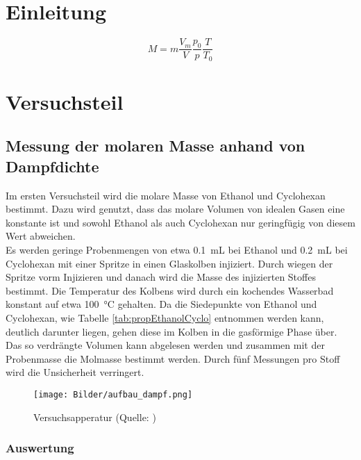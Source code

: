 \section{Einleitung}

\begin{equation}
	M = m \frac{V_m}{V}\frac{p_0}{p}\frac{T}{T_0} \label{eq:dampfMolMasse}
\end{equation}

\section{Versuchsteil}
\subsection{Messung der molaren Masse anhand von Dampfdichte}
Im ersten Versuchsteil wird die molare Masse von Ethanol und Cyclohexan bestimmt. Dazu wird genutzt, dass das molare Volumen von idealen Gasen eine konstante ist und sowohl Ethanol als auch Cyclohexan nur geringfügig von diesem Wert abweichen. \\
Es werden geringe Probenmengen von etwa \SI{.1}{\milli\liter} bei Ethanol und \SI{.2}{\milli\liter} bei Cyclohexan mit einer Spritze in einen Glaskolben injiziert. Durch wiegen der Spritze vorm Injizieren und danach wird die Masse des injizierten Stoffes bestimmt. Die Temperatur des Kolbens wird durch ein kochendes Wasserbad konstant auf etwa \SI{100}{\degreeCelsius} gehalten. Da die Siedepunkte von Ethanol und Cyclohexan, wie Tabelle \ref{tab:propEthanolCyclo} entnommen werden kann, deutlich darunter liegen, gehen diese im Kolben in die gasförmige Phase über. Das so verdrängte Volumen kann abgelesen werden und zusammen mit der Probenmasse die Molmasse bestimmt werden. Durch fünf Messungen pro Stoff wird die Unsicherheit verringert.
\begin{figure}[H]
\centering
\texttt{[image: Bilder/aufbau\_dampf.png]}
\caption[Aufbau]{Versuchsapperatur (Quelle: \cite{anleitung2015})}
\label{fig:aufbau_dampf}
\end{figure}
\subsubsection{Auswertung}

